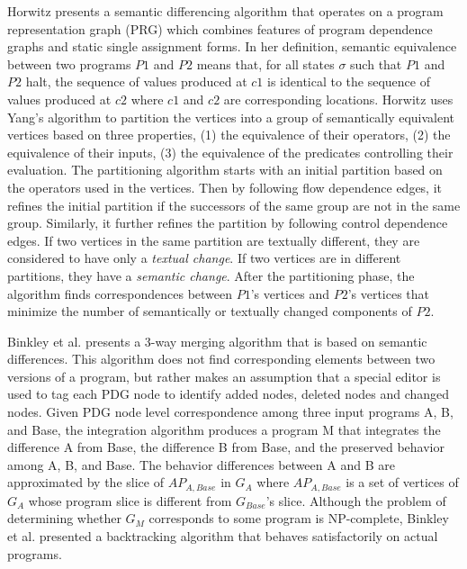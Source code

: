 \documentclass[runningheads,a4paper]{llncs}
\begin{document}
Horwitz \cite{Horwitz1990} presents a semantic differencing algorithm that operates on a program representation graph (PRG) which combines features of program dependence graphs and static single assignment forms. In her definition, semantic equivalence between two programs $P1$ and $P2$ means that, for all states $\sigma$ such that $P1$ and $P2$ halt, the sequence of values produced at $c1$ is identical to the sequence of values produced at $c2$ where $c1$ and $c2$ are corresponding locations. 
Horwitz uses Yang's algorithm \cite{Yang1989} to partition the vertices into a group of semantically equivalent vertices based on three properties, (1) the equivalence of their operators, (2) the equivalence of their inputs, (3) the equivalence of the predicates controlling their evaluation. The partitioning algorithm starts with an initial partition based on the operators used in the vertices. Then by following flow dependence edges, it refines the initial partition if the successors of the same group are not in the same group. Similarly, it further refines the partition by following control dependence edges. If two vertices in the same partition are textually different, they are considered to have only a {\it textual change}. If two vertices are in different partitions, they have a {\it semantic change}. After the partitioning phase, the algorithm finds correspondences between $P1$'s vertices and $P2$'s vertices that minimize the number of semantically or textually changed components of $P2$. 

Binkley et al. \cite{Binkley1995} presents a 3-way merging algorithm that is based on semantic differences. This algorithm does not find corresponding elements between two versions of a program, but rather makes an assumption that a special editor is used to tag each PDG node to identify added nodes, deleted nodes and changed nodes. Given PDG node level correspondence among three input programs A, B, and Base, the integration algorithm produces a program M that integrates the difference A from Base, the difference B from Base, and the preserved behavior among A, B, and Base. The behavior differences between A and B are approximated by the slice of $AP_{A,Base}$ in $G_A$ where $AP_{A,Base}$ is a set of vertices of $G_A$ whose program slice is different from $G_{Base}$'s slice. Although the problem of determining  whether $G_M$ corresponds to some program is NP-complete, Binkley et al. presented a backtracking algorithm that behaves satisfactorily on actual programs. 
\end{document}
